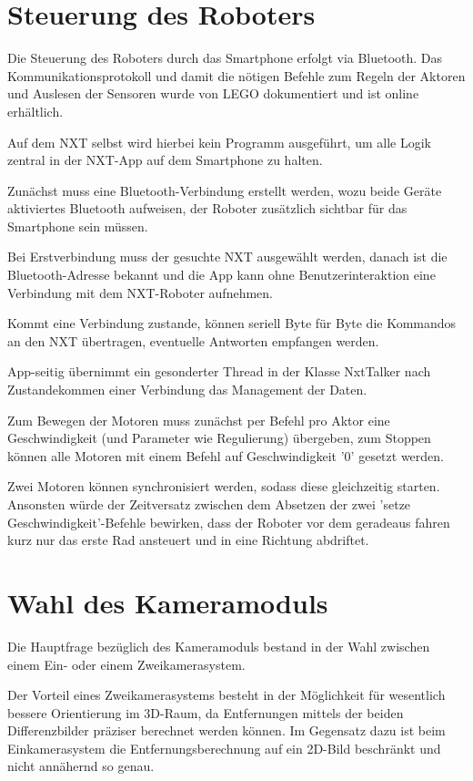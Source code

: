 \pagebreak

\section{Steuerung des Roboters}

Die Steuerung des Roboters durch das Smartphone erfolgt via Bluetooth.
Das Kommunikationsprotokoll und damit die nötigen Befehle zum Regeln der Aktoren und Auslesen der Sensoren wurde von LEGO dokumentiert und ist online erhältlich\cite{nxt_comm_protocol}.

Auf dem NXT selbst wird hierbei kein Programm ausgeführt, um alle Logik zentral in der NXT-App auf dem Smartphone zu halten.

Zunächst muss eine Bluetooth-Verbindung erstellt werden, wozu beide Geräte aktiviertes Bluetooth aufweisen, der Roboter zusätzlich sichtbar für das Smartphone sein müssen.

Bei Erstverbindung muss der gesuchte NXT ausgewählt werden, danach ist die Bluetooth-Adresse bekannt und die App kann ohne Benutzerinteraktion eine Verbindung mit dem NXT-Roboter aufnehmen.

Kommt eine Verbindung zustande, können seriell Byte für Byte die Kommandos an den NXT übertragen, eventuelle Antworten empfangen werden.

App-seitig übernimmt ein gesonderter Thread in der Klasse NxtTalker nach Zustandekommen einer Verbindung das Management der Daten.

Zum Bewegen der Motoren muss zunächst per Befehl pro Aktor eine Geschwindigkeit (und Parameter wie Regulierung) übergeben, zum Stoppen können alle Motoren mit einem Befehl auf Geschwindigkeit '0' gesetzt werden.

Zwei Motoren können synchronisiert werden, sodass diese gleichzeitig starten. Ansonsten würde der Zeitversatz zwischen dem Absetzen der zwei 'setze Geschwindigkeit'-Befehle bewirken, dass der Roboter vor dem geradeaus fahren kurz nur das erste Rad ansteuert und in eine Richtung abdriftet.

\pagebreak

\section{Wahl des Kameramoduls}
\label{sec:Kamera}

Die Hauptfrage bezüglich des Kameramoduls bestand in der Wahl zwischen einem Ein- oder einem Zweikamerasystem.

Der Vorteil eines Zweikamerasystems besteht in der Möglichkeit für wesentlich bessere Orientierung im 3D-Raum, da Entfernungen mittels der beiden Differenzbilder präziser berechnet werden können.
Im Gegensatz dazu ist beim Einkamerasystem die Entfernungsberechnung auf ein 2D-Bild beschränkt und nicht annähernd so genau.

